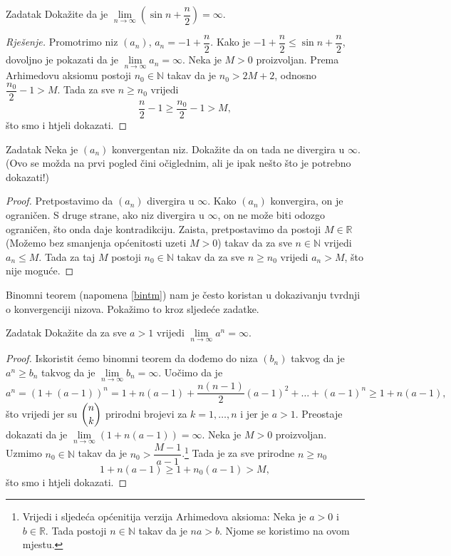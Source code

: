 \begin{exercise}{Zadatak}
Dokažite da je \(\lim\limits_{n\to \infty}\left(\sin{n}+\dfrac{n}{2}\right)=\infty\).
\end{exercise}
\begin{proof}[Rješenje]
Promotrimo niz \((a_n)\), \(a_n=-1+\dfrac{n}{2}\). Kako je \(-1+\dfrac{n}{2}\leq \sin{n}+\dfrac{n}{2}\), dovoljno je pokazati da je \(\lim\limits_{n\to \infty}{a_n}=\infty\). Neka je \(M>0\) proizvoljan. Prema Arhimedovu aksiomu postoji \(n_0\in \mathbb{N}\) takav da je \(n_0>2M+2\), odnosno \(\dfrac{n_0}{2}-1>M\). Tada za sve \(n\geq n_0\) vrijedi 
\[\dfrac{n}{2}-1\geq \dfrac{n_0}{2}-1>M,\]
što smo i htjeli dokazati.
\end{proof}
\begin{exercise}{Zadatak}
\label{Thisisobviousriiiiiiight}
Neka je \((a_n)\) konvergentan niz. Dokažite da on tada ne divergira u \(\infty\). (Ovo se možda na prvi pogled čini očiglednim, ali je ipak nešto što je potrebno dokazati!)
\end{exercise}
\begin{proof}
Pretpostavimo da \((a_n)\) divergira u \(\infty\). Kako \((a_n)\) konvergira, on je ograničen. S druge strane, ako niz divergira u \(\infty\), on ne može biti odozgo ograničen, što onda daje kontradikciju. Zaista, pretpostavimo da postoji \(M\in \mathbb{R}\) (Možemo bez smanjenja općenitosti uzeti \(M>0\)) takav da za sve \(n\in \mathbb{N}\) vrijedi \(a_n\leq M\). Tada za taj \(M\) postoji \(n_0\in \mathbb{N}\) takav da za sve \(n\geq n_0\) vrijedi \(a_n>M\), što nije moguće.
\end{proof}
Binomni teorem (napomena \ref{bintm}) nam je često koristan u dokazivanju tvrdnji o konvergenciji nizova. Pokažimo to kroz sljedeće zadatke.
\begin{exercise}{Zadatak}
\label{liman}
Dokažite da za sve \(a>1\) vrijedi \(\lim\limits_{n\to \infty}{a^n}=\infty\).
\end{exercise}
\begin{proof}
Iskoristit ćemo binomni teorem da dođemo do niza \((b_n)\) takvog da je \(a^n\geq b_n\) takvog da je \(\lim\limits_{n\to \infty}{b_n}=\infty\). Uočimo da je
\[a^n=(1+(a-1))^n=1+n(a-1)+\dfrac{n(n-1)}{2}(a-1)^2+\dots+(a-1)^n\geq 1+n(a-1),\]
što vrijedi jer su \(\dbinom{n}{k}\) prirodni brojevi za \(k=1,\dots, n\) i jer je \(a>1\). Preostaje dokazati da je \(\lim\limits_{n\to \infty}\left(1+n\left(a-1\right)\right)=\infty\). Neka je \(M>0\) proizvoljan. Uzmimo \(n_0\in \mathbb{N}\) takav da je \(n_0>\dfrac{M-1}{a-1}\).\footnote{Vrijedi i sljedeća općenitija verzija Arhimedova aksioma: Neka je \(a>0\) i \(b\in \mathbb{R}\). Tada postoji \(n\in \mathbb{N}\) takav da je \(na>b\). Njome se koristimo na ovom mjestu.} Tada je za sve prirodne \(n\geq n_0\)
\[1+n(a-1)\geq 1+n_0(a-1)>M,\]
što smo i htjeli dokazati.
\end{proof}
